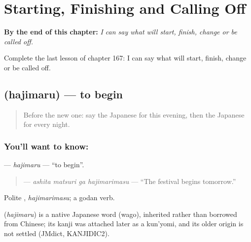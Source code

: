 
\chapter{Starting, Finishing and Calling Off}
\label{ch:ja-starting-finishing-and-calling-off}

\begin{chapteropening}
\textbf{By the end of this chapter:} \emph{I can say what will start, finish, change or be called off.}

Complete the last lesson of chapter 167: I can say what will start, finish, change or be called off.
\end{chapteropening}

\section[\texorpdfstring{\ja{はじまる} (hajimaru)}{はじまる (hajimaru)}]{ (hajimaru) — to begin}

\label{lesson:JA-C167-hajimaru}



\begin{quote}
Before the new one: say the Japanese for this evening, then the Japanese for every night.
\end{quote}

\subsection*{You'll want to know: }
\textbf{} — \emph{hajimaru} — \textquotedblleft{}to begin\textquotedblright{}.

\begin{quote}
\textbf{  } — \emph{ashita matsuri ga hajimarimasu} — \textquotedblleft{}The festival begins tomorrow.\textquotedblright{}
\end{quote}

Polite \textbf{}, \emph{hajimarimasu}; a godan verb.

\begin{cousinweb}
\textbf{} (\emph{hajimaru}) is a native Japanese word (wago), inherited rather than borrowed from Chinese; its kanji was attached later as a kun'yomi, and its older origin is not settled (JMdict, KANJIDIC2).
\end{cousinweb}

